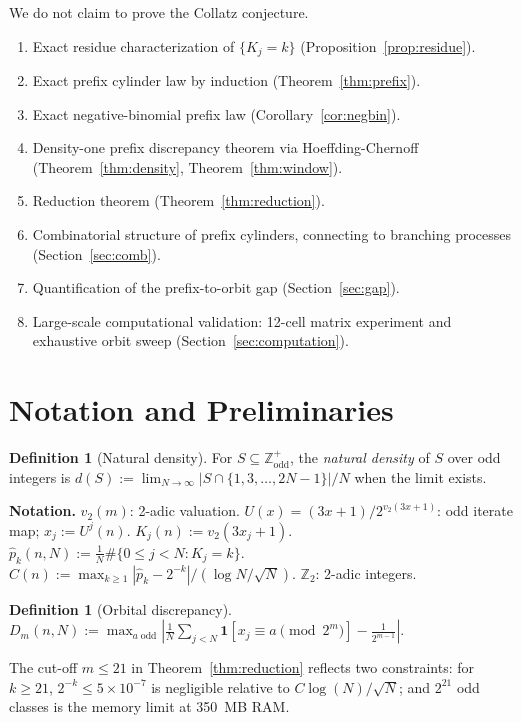 \documentclass[12pt]{article}
\theoremstyle{definition}
\newtheorem{definition}[theorem]{Definition}
\theoremstyle{remark}
\begin{document}
We do not claim to prove the Collatz conjecture.
\begin{enumerate}
\item Exact residue characterization of $\{K_j=k\}$
  (Proposition~\ref{prop:residue}).
\item Exact prefix cylinder law by induction
  (Theorem~\ref{thm:prefix}).
\item Exact negative-binomial prefix law
  (Corollary~\ref{cor:negbin}).
\item Density-one prefix discrepancy theorem via Hoeffding-Chernoff
  (Theorem~\ref{thm:density}, Theorem~\ref{thm:window}).
\item Reduction theorem (Theorem~\ref{thm:reduction}).
\item Combinatorial structure of prefix cylinders, connecting to
  branching processes (Section~\ref{sec:comb}).
\item Quantification of the prefix-to-orbit gap (Section~\ref{sec:gap}).
\item Large-scale computational validation: 12-cell matrix experiment
  and exhaustive orbit sweep (Section~\ref{sec:computation}).
\end{enumerate}

\section{Notation and Preliminaries}

\begin{definition}[Natural density]
For $S\subseteq\mathbb{Z}^+_{\mathrm{odd}}$, the \emph{natural density}
of $S$ over odd integers is
$d(S):=\lim_{N\to\infty}|S\cap\{1,3,\ldots,2N-1\}|/N$
when the limit exists.
\end{definition}

\noindent\textbf{Notation.}
$v_2(m)$: 2-adic valuation.
$U(x)=(3x+1)/2^{v_2(3x+1)}$: odd iterate map; $x_j:=U^j(n)$.
$K_j(n):=v_2(3x_j+1)$.
$\hat{p}_k(n,N):=\frac{1}{N}\#\{0\leq j<N:K_j=k\}$.
$C(n):=\max_{k\geq 1}|\hat{p}_k-2^{-k}|/(\log N/\sqrt N)$.
$\mathbb{Z}_2$: 2-adic integers.

\begin{definition}[Orbital discrepancy]\label{def:disc}
$D_m(n,N):=\max_{a\;\mathrm{odd}}
\left|\frac{1}{N}\sum_{j<N}\mathbf{1}[x_j\equiv a\pmod{2^m}]
-\frac{1}{2^{m-1}}\right|.$
\end{definition}

The cut-off $m\leq 21$ in Theorem~\ref{thm:reduction} reflects two
constraints: for $k\geq 21$, $2^{-k}\leq 5\times 10^{-7}$ is
negligible relative to $C\log(N)/\sqrt{N}$; and $2^{21}$ odd classes
is the memory limit at 350~MB RAM.
\end{document}
